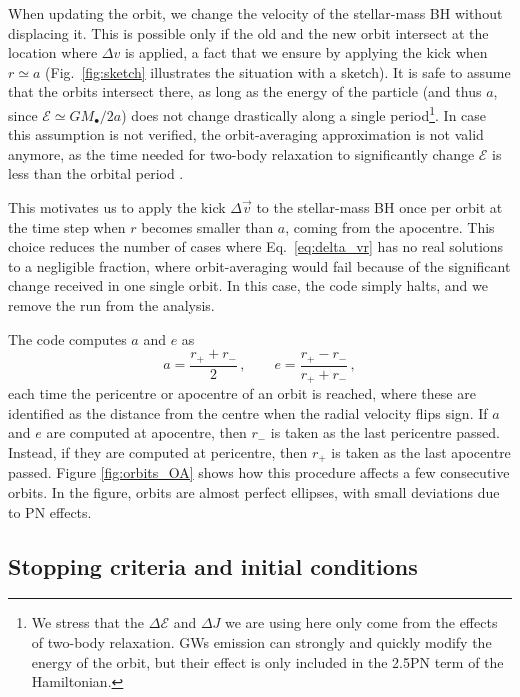 \documentclass[desactivate]{aa}
\begin{document}
        When updating the orbit, we change the velocity of the stellar-mass BH without displacing it. This is possible only if the old and the new orbit intersect at the location where $\Delta v$ is applied, a fact that we ensure by applying the kick when $r\simeq a$ (Fig.\ \ref{fig:sketch} illustrates the situation with a sketch). It is safe to assume that the orbits intersect there, as long as the energy of the particle (and thus $a$, since $\mathcal{E} \simeq G M_\bullet / 2 a$) does not change drastically along a single period\footnote{We stress that the $\Delta \mathcal{E}$ and $\Delta J$ we are using here only come from the effects of two-body relaxation. GWs emission can strongly and quickly modify the energy of the orbit, but their effect is only included in the 2.5PN term of the Hamiltonian.}. In case this assumption is not verified, the orbit-averaging approximation is not valid anymore, as the time needed for two-body relaxation to significantly change $\mathcal{E}$ is less than the orbital period \citep{2008gady.book.....B,2013degn.book.....M}.
         
        This motivates us to apply the kick $\Delta \vec{v}$ to the stellar-mass BH once per orbit at the time step when $r$ becomes smaller than $a$, coming from the apocentre. This choice reduces the number of cases where Eq.\ \eqref{eq:delta_vr} has no real solutions to a negligible fraction, where orbit-averaging would fail because of the significant change received in one single orbit. In this case, the code simply halts, and we remove the run from the analysis.

        The code computes $a$ and $e$ as
        \begin{equation}
            a = \frac{r_+ + r_-}{2} \, , \qquad e = \frac{r_+ - r_-}{r_+ + r_-} \, ,
        \end{equation}
        each time the pericentre or apocentre of an orbit is reached, where these are identified as the distance from the centre when the radial velocity flips sign. If $a$ and $e$ are computed at apocentre, then $r_-$ is taken as the last pericentre passed. Instead, if they are computed at pericentre, then $r_+$ is taken as the last apocentre passed. 
        Figure \ref{fig:orbits_OA} shows how this procedure affects a few consecutive orbits. In the figure, orbits are almost perfect ellipses, with small deviations due to PN effects. 

    \subsection{Stopping criteria and initial conditions} \label{sec:stopping}
\end{document}
